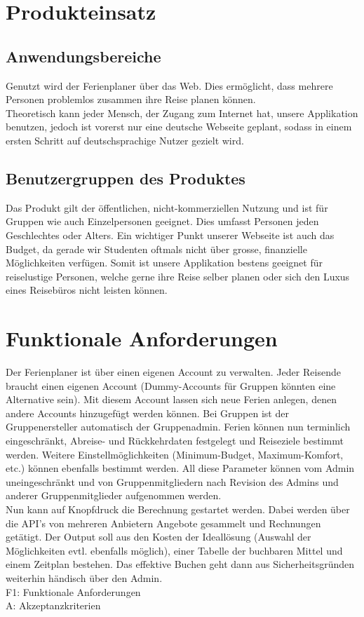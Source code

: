 \documentclass[10pt,a4paper,titlepage,twoside,german,final]{zhawreprt}
\numberwithin{table}{chapter}
\begin{document}
\chapter{Produkteinsatz}\label{chp:ProductApplication}
\section{Anwendungsbereiche}\label{sec:FieldOfApplience}
Genutzt wird der Ferienplaner über das Web. Dies ermöglicht, dass mehrere Personen problemlos zusammen ihre Reise planen können.\\
Theoretisch kann jeder Mensch, der Zugang zum Internet hat, unsere Applikation benutzen, jedoch ist vorerst nur eine deutsche Webseite geplant, sodass in einem ersten Schritt auf deutschsprachige Nutzer gezielt wird.
\section{Benutzergruppen des Produktes}\label{sec:TargetAudience}
Das Produkt gilt der öffentlichen, nicht-kommerziellen Nutzung und ist für Gruppen wie auch Einzelpersonen geeignet. Dies umfasst Personen jeden Geschlechtes oder Alters. Ein wichtiger Punkt unserer Webseite ist auch das Budget, da gerade wir Studenten oftmals nicht über grosse, finanzielle Möglichkeiten verfügen. Somit ist unsere Applikation bestens geeignet für reiselustige Personen, welche gerne ihre Reise selber planen oder sich den Luxus eines Reisebüros nicht leisten können.

\chapter{Funktionale Anforderungen}\label{chp:FunctionalRequirements}
Der Ferienplaner ist über einen eigenen Account zu verwalten. Jeder Reisende braucht einen eigenen Account (Dummy-Accounts für Gruppen könnten eine Alternative sein). Mit diesem Account lassen sich neue Ferien anlegen, denen andere Accounts hinzugefügt werden können. Bei Gruppen ist der Gruppenersteller automatisch der Gruppenadmin. Ferien können nun terminlich eingeschränkt, Abreise- und Rückkehrdaten festgelegt und Reiseziele bestimmt werden. Weitere Einstellmöglichkeiten (Minimum-Budget, Maximum-Komfort, etc.) können ebenfalls bestimmt werden. All diese Parameter können vom Admin uneingeschränkt und von Gruppenmitgliedern nach Revision des Admins und anderer Gruppenmitglieder aufgenommen werden.\\
Nun kann auf Knopfdruck die Berechnung gestartet werden. Dabei werden über die API's von mehreren Anbietern Angebote gesammelt und Rechnungen getätigt. Der Output soll aus den Kosten der Ideallösung (Auswahl der Möglichkeiten evtl. ebenfalls möglich), einer Tabelle der buchbaren Mittel und einem Zeitplan bestehen. Das effektive Buchen geht dann aus Sicherheitsgründen weiterhin händisch über den Admin.\\
F1: Funktionale Anforderungen\\
A: Akzeptanzkriterien\\
\end{document}
